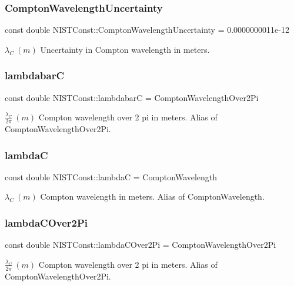 \subsubsection{\texorpdfstring{Compton\+Wavelength\+Uncertainty}{ComptonWavelengthUncertainty}}
{\footnotesize\ttfamily const double N\+I\+S\+T\+Const\+::\+Compton\+Wavelength\+Uncertainty = 0.\+0000000011e-\/12}

$\lambda_C \ (m)$ Uncertainty in Compton wavelength in meters. \mbox{\label{group___compton_wavelength_gaeed48ca7330a4ba9227043237fed90f9}} 
\subsubsection{\texorpdfstring{lambdabarC}{lambdabarC}}
{\footnotesize\ttfamily const double N\+I\+S\+T\+Const\+::lambdabarC = Compton\+Wavelength\+Over2\+Pi}

$\frac{\lambda_C}{2\pi} \ (m)$ Compton wavelength over 2 pi in meters. Alias of Compton\+Wavelength\+Over2\+Pi. \mbox{\label{group___compton_wavelength_gae311e27b1f359b90efb6895ddf388a80}} 
\subsubsection{\texorpdfstring{lambdaC}{lambdaC}}
{\footnotesize\ttfamily const double N\+I\+S\+T\+Const\+::lambdaC = Compton\+Wavelength}

$\lambda_C \ (m)$ Compton wavelength in meters. Alias of Compton\+Wavelength. \mbox{\label{group___compton_wavelength_gadaf3906a9db23eece3ac4e130978a8ce}} 
\subsubsection{\texorpdfstring{lambda\+C\+Over2\+Pi}{lambdaCOver2Pi}}
{\footnotesize\ttfamily const double N\+I\+S\+T\+Const\+::lambda\+C\+Over2\+Pi = Compton\+Wavelength\+Over2\+Pi}

$\frac{\lambda_C}{2\pi} \ (m)$ Compton wavelength over 2 pi in meters. Alias of Compton\+Wavelength\+Over2\+Pi. 